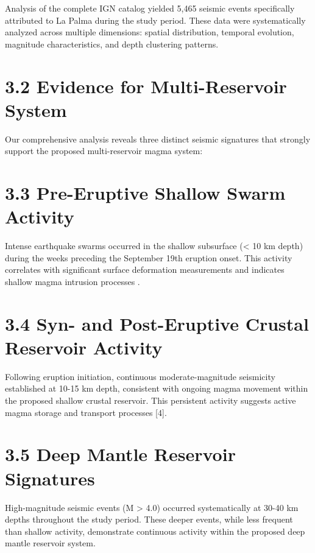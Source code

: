 \documentclass[
  letterpaper,
]{book}
\begin{document}
Analysis of the complete IGN catalog yielded 5,465 seismic events
specifically attributed to La Palma during the study period. These data
were systematically analyzed across multiple dimensions: spatial
distribution, temporal evolution, magnitude characteristics, and depth
clustering patterns.

\section{3.2 Evidence for Multi-Reservoir
System}\label{evidence-for-multi-reservoir-system}

Our comprehensive analysis reveals three distinct seismic signatures
that strongly support the proposed multi-reservoir magma system:

\section{3.3 Pre-Eruptive Shallow Swarm
Activity}\label{pre-eruptive-shallow-swarm-activity}

Intense earthquake swarms occurred in the shallow subsurface
(\textless{} 10 km depth) during the weeks preceding the September 19th
eruption onset. This activity correlates with significant surface
deformation measurements and indicates shallow magma intrusion processes
.

\section{3.4 Syn- and Post-Eruptive Crustal Reservoir
Activity}\label{syn--and-post-eruptive-crustal-reservoir-activity}

Following eruption initiation, continuous moderate-magnitude seismicity
established at 10-15 km depth, consistent with ongoing magma movement
within the proposed shallow crustal reservoir. This persistent activity
suggests active magma storage and transport processes {[}4{]}.

\section{3.5 Deep Mantle Reservoir
Signatures}\label{deep-mantle-reservoir-signatures}

High-magnitude seismic events (M \textgreater{} 4.0) occurred
systematically at 30-40 km depths throughout the study period. These
deeper events, while less frequent than shallow activity, demonstrate
continuous activity within the proposed deep mantle reservoir system.
\end{document}
